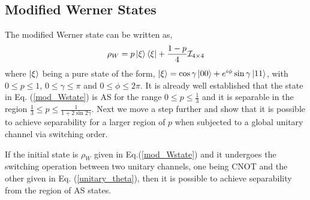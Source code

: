 \subsection{Modified Werner States}
The modified Werner state \cite{W_89} can be written as, 
\begin{equation}
    \rho_W = p \ket{\xi}\bra{\xi}+ \frac{1-p}{4} \mathcal{I}_{4 \times 4}
    \label{mod_Wstate}
\end{equation}
where $\ket{\xi}$ being a pure state of the form, $\ket{\xi} = \cos{\gamma}\ket{00} + e^{i\phi} \sin{\gamma}\ket{11}$, with $0 \leq p \leq 1$, $0 \leq \gamma \leq \pi$ and $0 \leq \phi \leq 2\pi$. It is already well established that the state in Eq. (\ref{mod_Wstate}) is AS for the range $0\leq p \leq \frac{1}{3}$ and it is separable in the region $\frac{1}{3}\leq p\leq \frac{1}{1+2\sin{2 \gamma}}$. Next we move a step further and show that it is possible to achieve separability for a larger region of $p$ when subjected to a global unitary channel via switching order. 
    
\begin{result}
    If the initial state is $\rho_W$ given in Eq.(\ref{mod_Wstate}) and it undergoes the switching operation between two unitary channels, one being CNOT and the other given in Eq. (\ref{unitary_theta}), then it is possible to achieve separability from the region of AS states.
\end{result}

